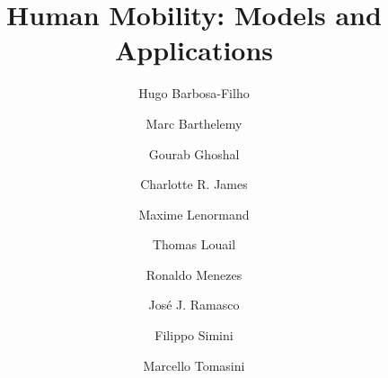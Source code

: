 \documentclass[preprint, times]{elsarticle}
\begin{document}
\begin{frontmatter}

\title{Human Mobility: Models and Applications}

\author[ros]{Hugo Barbosa-Filho}

\author[cea,ehess]{Marc Barthelemy}

\author[ros]{Gourab Ghoshal}

\author[bri]{Charlotte R. James}

\author[isrtea]{Maxime Lenormand}

\author[geocites]{Thomas Louail}

\author[fit]{Ronaldo Menezes}

\author[ifisc]{Jos\'e J. Ramasco}

\author[bri]{Filippo Simini}

\author[fit]{Marcello Tomasini}


\address[ros]{Department of Physics \& Astronomy and Goergen Institute of Data Science, University of Rochester, Rochester, NY, USA}

\address[cea]{Institut de Physique Th\'eorique, CEA, CNRS-URA 2306, F-91191, Gif-sur-Yvette, France}

\address[ehess]{Centre d'Etudes et de Math\'ematique Sociales, EHESS, Paris 75006, France}

\address[bri]{Department of Engineering Mathematics, University of Bristol, UK}

\address[isrtea]{Irstea, UMR TETIS, 500 rue JF Breton, 34093 Montpellier, France}

\address[ifisc]{Instituto de F\'{\i}sica Interdisciplinar y Sistemas Complejos IFISC (CSIC-UIB), Campus UIB, 07122 Palma de Mallorca, Spain}

\address[geocites]{CNRS, UMR 8504 G\'eographie-cit\'es, 13 rue du four, F-75006 Paris, France}

\address[fit]{BioComplex Laboratory, School of Computing, Florida Institute
  of Technology, Melbourne, USA}




\end{frontmatter}
\end{document}

